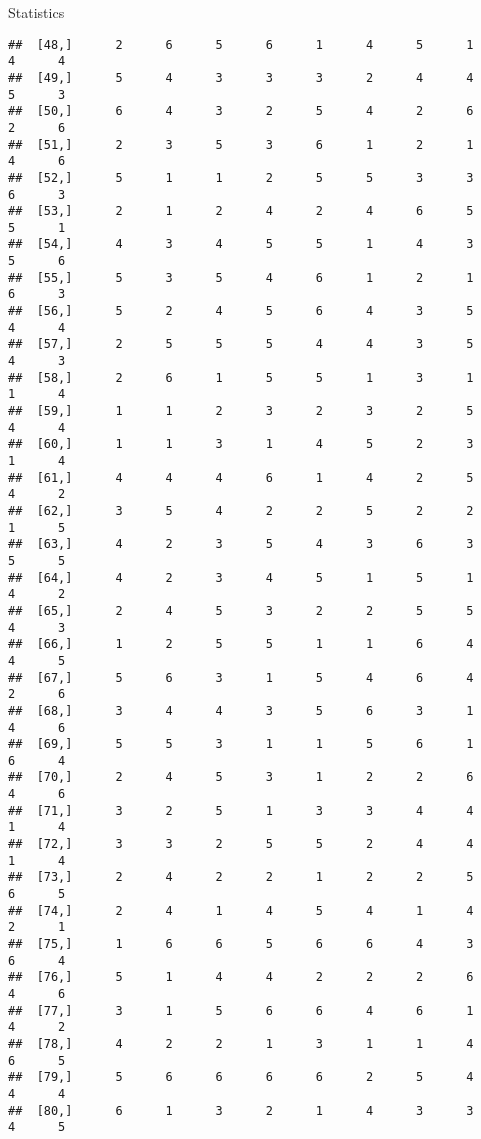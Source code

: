 \documentclass[
  ignorenonframetext,
]{beamer}
\begin{document}
\begin{frame}[fragile]{Statistics}
\begin{verbatim}
##  [48,]      2      6      5      6      1      4      5      1      4      4
##  [49,]      5      4      3      3      3      2      4      4      5      3
##  [50,]      6      4      3      2      5      4      2      6      2      6
##  [51,]      2      3      5      3      6      1      2      1      4      6
##  [52,]      5      1      1      2      5      5      3      3      6      3
##  [53,]      2      1      2      4      2      4      6      5      5      1
##  [54,]      4      3      4      5      5      1      4      3      5      6
##  [55,]      5      3      5      4      6      1      2      1      6      3
##  [56,]      5      2      4      5      6      4      3      5      4      4
##  [57,]      2      5      5      5      4      4      3      5      4      3
##  [58,]      2      6      1      5      5      1      3      1      1      4
##  [59,]      1      1      2      3      2      3      2      5      4      4
##  [60,]      1      1      3      1      4      5      2      3      1      4
##  [61,]      4      4      4      6      1      4      2      5      4      2
##  [62,]      3      5      4      2      2      5      2      2      1      5
##  [63,]      4      2      3      5      4      3      6      3      5      5
##  [64,]      4      2      3      4      5      1      5      1      4      2
##  [65,]      2      4      5      3      2      2      5      5      4      3
##  [66,]      1      2      5      5      1      1      6      4      4      5
##  [67,]      5      6      3      1      5      4      6      4      2      6
##  [68,]      3      4      4      3      5      6      3      1      4      6
##  [69,]      5      5      3      1      1      5      6      1      6      4
##  [70,]      2      4      5      3      1      2      2      6      4      6
##  [71,]      3      2      5      1      3      3      4      4      1      4
##  [72,]      3      3      2      5      5      2      4      4      1      4
##  [73,]      2      4      2      2      1      2      2      5      6      5
##  [74,]      2      4      1      4      5      4      1      4      2      1
##  [75,]      1      6      6      5      6      6      4      3      6      4
##  [76,]      5      1      4      4      2      2      2      6      4      6
##  [77,]      3      1      5      6      6      4      6      1      4      2
##  [78,]      4      2      2      1      3      1      1      4      6      5
##  [79,]      5      6      6      6      6      2      5      4      4      4
##  [80,]      6      1      3      2      1      4      3      3      4      5

\end{verbatim}
\end{frame}
\end{document}
